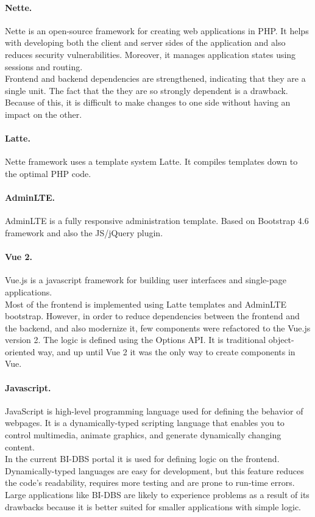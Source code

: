 \paragraph*{Nette.} Nette is an open-source framework for creating web applications in PHP. It helps with developing both the client and server sides of the application and also reduces security vulnerabilities. Moreover, it manages application states using sessions and routing.\cite{nette-doc}\\ 
Frontend and backend dependencies are strengthened, indicating that they are a single unit. The fact that the they are so strongly dependent is a drawback. Because of this, it is difficult to make changes to one side without having an impact on the other. 

\paragraph*{Latte.} Nette framework uses a template system Latte. It compiles templates down to the optimal PHP code.\cite{latte-doc}

\paragraph*{AdminLTE.} AdminLTE is a fully responsive administration template. Based on Bootstrap 4.6 framework and also the JS/jQuery plugin.\cite{adminlte-doc} 

\paragraph*{Vue 2.} Vue.js is a javascript framework for building user interfaces and single-page applications.\\
Most of the frontend is implemented using Latte templates and AdminLTE bootstrap. However, in order to reduce dependencies between the frontend and the backend, and also modernize it, few components were refactored to the Vue.js version 2. The logic is defined using the Options API. It is traditional object-oriented way, and up until Vue 2 it was the only way to create components in Vue.\cite{vue2-doc, apivue-dzakelsek}

\paragraph*{Javascript.} JavaScript is high-level programming language used for defining the behavior of webpages. It is a dynamically-typed scripting language that enables you to control multimedia, animate graphics, and generate dynamically changing content.\cite{js-doc}\\ 
In the current BI-DBS portal it is used for defining logic on the frontend. Dynamically-typed languages are easy for development, but this feature reduces the code's readability, requires more testing and are prone to run-time errors. Large applications like BI-DBS are likely to experience problems as a result of its drawbacks because it is better suited for smaller applications with simple logic.

